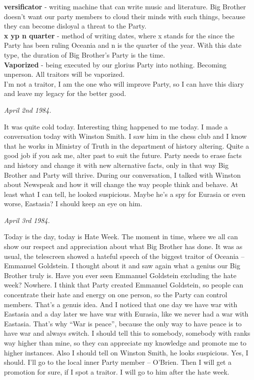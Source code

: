\documentclass{article}
\begin{document}
\textbf{versificator} - writing machine that can write music and literature. Big Brother doesn't want our party members to cloud their minds with such things, because they can become disloyal a threat to the Party.\\

\textbf{x yp n quarter} - method of writing dates, where x stands for the since the Party has been ruling Oceania and n is the quarter of the year. With this date type, the duration of Big Brother's Party is the time.\\

\textbf{Vaporized} - being executed by our glorius Party into nothing. Becoming unperson. All traitors will be vaporized.\\

I'm not a traitor, I am the one who will improve Party, so I can have this diary and leave my legacy for the better good.\\

\begin{flushleft}
  \textit{April 2nd 1984.}
  \end{flushleft}

It was quite cold today. Interesting thing happened to me today. I made a conversation today with Winston Smith. I saw him in the chess club and I know that he works in Ministry of Truth in the department of history altering. Quite a good job if you ask me, alter past to suit the future. Party needs to erase facts and history and change it with new alternative facts, only in that way Big Brother and Party will thrive. During our conversation, I talked with Winston about Newspeak and how it will change the way people think and behave. At least what I can tell, he looked suspicious. Maybe he's a spy for Eurasia or even worse, Eastasia? I should keep an eye on him.\\

\begin{flushleft}
  \textit{April 3rd 1984.}
  \end{flushleft}

Today is the day, today is Hate Week. The moment in time, where we all can show our respect and appreciation about what Big Brother has done. It was as usual, the telescreen showed a hateful speech of the biggest traitor of Oceania – Emmanuel Goldstein. I thought about it and saw again what a genius our Big Brother truly is. Have you ever seen Emmanuel Goldstein excluding the hate week? Nowhere. I think that Party created Emmanuel Goldstein, so people can concentrate their hate and energy on one person, so the Party can control members. That's a genuis idea. And I noticed that one day we have war with Eastasia and a day later we have war with Eurasia, like we never had a war with Eastasia. That's why “War is peace”, because the only way to have peace is to have war and always switch. I should tell this to somebody, somebody with ranks way higher than mine, so they can appreciate my knowledge and promote me to higher instances. Also I should tell on Winston Smith, he looks suspicious. Yes, I should. I'll go to the local inner Party member – O'Brien.  Then I will get a promotion for sure, if I spot a traitor. I will go to him after the hate week.\\
\end{document}
